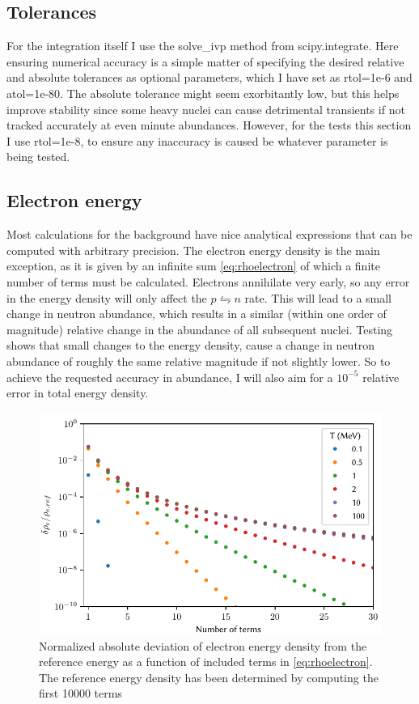 \subsection{Tolerances}
For the integration itself I use the solve\_ivp method from scipy.integrate\cite{SciPy}. Here ensuring numerical accuracy is a simple matter of specifying the desired relative and absolute tolerances as optional parameters, which I have set as  rtol=1e-6 and atol=1e-80. The absolute tolerance might seem exorbitantly low, but this helps improve stability since some heavy nuclei can cause detrimental transients if not tracked accurately at even minute abundances. However, for the tests this section I use rtol=1e-8, to ensure any inaccuracy is caused be whatever parameter is being tested.


\subsection{Electron energy}
Most calculations for the background have nice analytical expressions that can be computed with arbitrary precision. The electron energy density is the main exception, as it is given by an infinite sum \eqref{eq:rhoelectron} of which a finite number of terms must be calculated. Electrons annihilate very early, so any error in the energy density will only affect the $p\leftrightharpoons n$ rate. This will lead to a small change in neutron abundance, which results in a similar (within one order of magnitude) relative change in the abundance of all subsequent nuclei. 
Testing shows that small changes to the energy density, cause a change in neutron abundance of roughly the same relative magnitude if not slightly lower. So to achieve the requested accuracy in abundance, I will also aim for a $10^{-5}$ relative error in total energy density. 
\begin{figure}[ht]
    \includegraphics[width=5.1in]{figures/Besselaccuracy.pdf}
    \caption{Normalized absolute deviation of electron energy density from the reference energy as a function of included terms in \eqref{eq:rhoelectron}. The reference energy density has been determined by computing the first 10000 terms}
    \label{fig:Besselaccuracy}
\end{figure}

